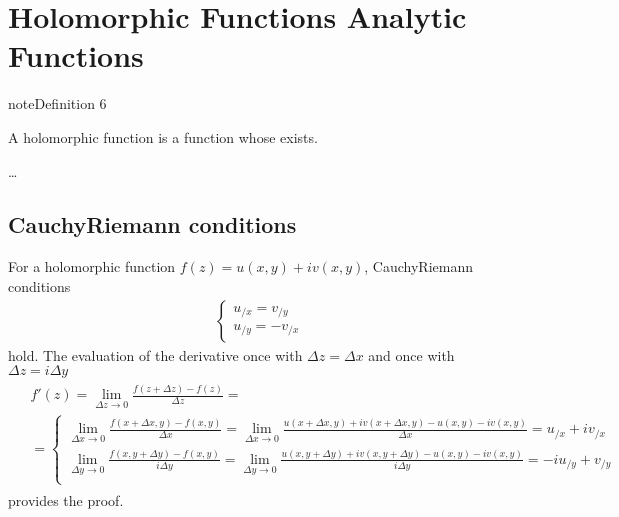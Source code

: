 \documentclass[letterpaper,10pt,english]{jupyterBook}
\begin{document}
\section{Holomorphic Functions \sphinxhyphen{} Analytic Functions}
\label{\detokenize{ch/complex/analysis:holomorphic-functions-analytic-functions}}\label{\detokenize{ch/complex/analysis:complex-analysis-holo-fun}}\label{ch/complex/analysis:definition-0}
\begin{sphinxadmonition}{note}{Definition 6}



\sphinxAtStartPar
A holomorphic function is a function whose {\hyperref[\detokenize{ch/complex/analysis:complex-analysis-fun-derivative}]{}} exists.
\end{sphinxadmonition}

\sphinxAtStartPar
{} …


\subsection{Cauchy\sphinxhyphen{}Riemann conditions}
\label{\detokenize{ch/complex/analysis:cauchy-riemann-conditions}}\label{\detokenize{ch/complex/analysis:complex-analysis-holo-fun-cauchy-riemann}}
\sphinxAtStartPar
For a holomorphic function \(f(z) = u(x,y) + i v(x,y)\), Cauchy\sphinxhyphen{}Riemann conditions
\begin{equation*}
\begin{split}\begin{cases}
u_{/x} = v_{/y} \\
u_{/y} = - v_{/x}
\end{cases}\end{split}
\end{equation*}
\sphinxAtStartPar
hold. The evaluation of the derivative once with \(\Delta z = \Delta x\) and once with \(\Delta z = i \Delta y\)
\begin{equation*}
\begin{split}\begin{aligned}
& f'(z) = \lim_{\Delta z \rightarrow 0} \frac{f(z+\Delta z) - f(z)}{\Delta z} = \\ 
& = \left\{
\begin{aligned}
  \lim_{\Delta x \rightarrow 0} \frac{f(x+\Delta x,y) - f(x,y)}{\Delta x} = \lim_{\Delta x \rightarrow 0} \frac{u(x+\Delta x,y) + i v(x+\Delta x,y) - u(x,y) - i v(x,y)}{\Delta x} = u_{/x} + i v_{/x} \\ 
  \lim_{\Delta y \rightarrow 0} \frac{f(x,y+\Delta y) - f(x,y)}{i \Delta y} = \lim_{\Delta y \rightarrow 0}  \frac{u(x,y+\Delta y) + i v(x,y+\Delta y) - u(x,y) - i v(x,y)}{i \Delta y} = -i u_{/y} + v_{/y} \\ 
\end{aligned}
\right.
\end{aligned}\end{split}
\end{equation*}
\sphinxAtStartPar
provides the proof.
\end{document}
